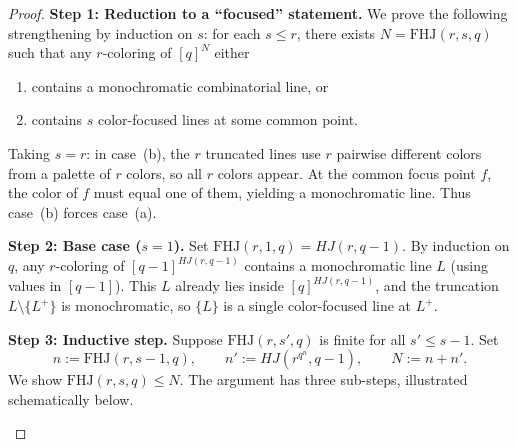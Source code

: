 \documentclass[11pt, a4paper]{ctexrep}
\begin{document}
\begin{proof}
    \medskip
    \noindent\textbf{Step 1: Reduction to a ``focused'' statement.}
    We prove the following strengthening by induction on $s$: for each $s\leqslant r$, there exists $N=\mathrm{FHJ}(r,s,q)$ such that any $r$-coloring of $[q]^N$ either
    \begin{enumerate}
        \item[(a)] contains a monochromatic combinatorial line, or
        \item[(b)] contains $s$ color-focused lines at some common point.
    \end{enumerate}
    Taking $s=r$: in case~(b), the $r$ truncated lines use $r$ pairwise different colors from a palette of $r$ colors, so all $r$ colors appear. At the common focus point $f$, the color of $f$ must equal one of them, yielding a monochromatic line. Thus case~(b) forces case~(a).

    \medskip
    \noindent\textbf{Step 2: Base case ($s=1$).}
    Set $\mathrm{FHJ}(r,1,q)=HJ(r,q-1)$. By induction on $q$, any $r$-coloring of $[q-1]^{HJ(r,q-1)}$ contains a monochromatic line $L$ (using values in $[q-1]$). This $L$ already lies inside $[q]^{HJ(r,q-1)}$, and the truncation $L\setminus\{L^+\}$ is monochromatic, so $\{L\}$ is a single color-focused line at $L^+$.

    \medskip
    \noindent\textbf{Step 3: Inductive step.}
    Suppose $\mathrm{FHJ}(r,s',q)$ is finite for all $s'\leqslant s-1$. Set
    \[
        n:=\mathrm{FHJ}(r,s-1,q), \qquad n':=HJ(r^{q^n},q-1), \qquad N:=n+n'.
    \]
    We show $\mathrm{FHJ}(r,s,q)\leqslant N$. The argument has three sub-steps, illustrated schematically below.

    \begin{center}
    \end{center}


\end{proof}
\end{document}
